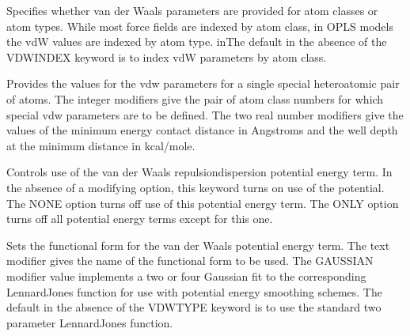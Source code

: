 \documentclass[letterpaper,11pt,english]{sphinxmanual}
\begin{document}
\ignorespaces {}\label{\detokenize{text/keywords:key-vdwindex}}\begin{description}
\sphinxAtStartPar
Specifies whether van der Waals parameters are provided for atom classes or atom types. While most force fields are indexed by atom class, in OPLS models the vdW values are indexed by atom type. inThe default in the absence of the VDWINDEX keyword is to index vdW parameters by atom class.

\end{description}

\ignorespaces {}\label{\detokenize{text/keywords:key-vdwpair}}\begin{description}
\sphinxAtStartPar
Provides the values for the vdw parameters for a single special heteroatomic pair of atoms. The integer modifiers give the pair of atom class numbers for which special vdw parameters are to be defined. The two real number modifiers give the values of the minimum energy contact distance in Angstroms and the well depth at the minimum distance in kcal/mole.

\end{description}

\ignorespaces {}\label{\detokenize{text/keywords:key-vdwterm}}\begin{description}
\sphinxAtStartPar
Controls use of the van der Waals repulsion\sphinxhyphen{}dispersion potential energy term. In the absence of a modifying option, this keyword turns on use of the potential. The NONE option turns off use of this potential energy term. The ONLY option turns off all potential energy terms except for this one.

\end{description}

\ignorespaces {}\label{\detokenize{text/keywords:key-vdwtype}}\begin{description}
\sphinxAtStartPar
Sets the functional form for the van der Waals potential energy term. The text modifier gives the name of the functional form to be used. The GAUSSIAN modifier value implements a two or four Gaussian fit to the corresponding Lennard\sphinxhyphen{}Jones function for use with potential energy smoothing schemes. The default in the absence of the VDWTYPE keyword is to use the standard two parameter Lennard\sphinxhyphen{}Jones function.

\end{description}
\end{document}
